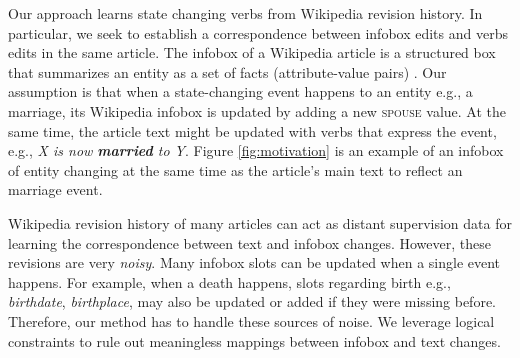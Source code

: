   

Our approach learns state changing verbs from Wikipedia revision history. In particular, we seek to establish a correspondence between infobox edits and verbs edits in the same article. The infobox of a  Wikipedia article is  a structured box that summarizes an entity as a set of facts (attribute-value pairs) . Our assumption is that when a state-changing event happens to an entity e.g., a marriage, its Wikipedia infobox is  updated by adding a new \textsc{spouse} value. 
At the same time, the article text  might be updated with verbs that express the event, e.g., \textit{X is now \textbf{married} to Y}.  Figure \ref{fig:motivation} is an example of an infobox of entity changing at the same time as the article's main text to reflect an marriage event.

Wikipedia revision history of many articles can act as distant supervision  data for learning the correspondence between text and infobox changes. However, these revisions are very  \textit{noisy}.  Many infobox slots can be  updated when a single event happens.
For example, when a death happens, slots regarding birth e.g., \textit{birthdate}, \textit{birthplace}, may also be updated or added if they were missing before.
Therefore, our method has to handle these sources of noise.  We leverage logical constraints  to rule out meaningless mappings  between infobox and text changes. 

